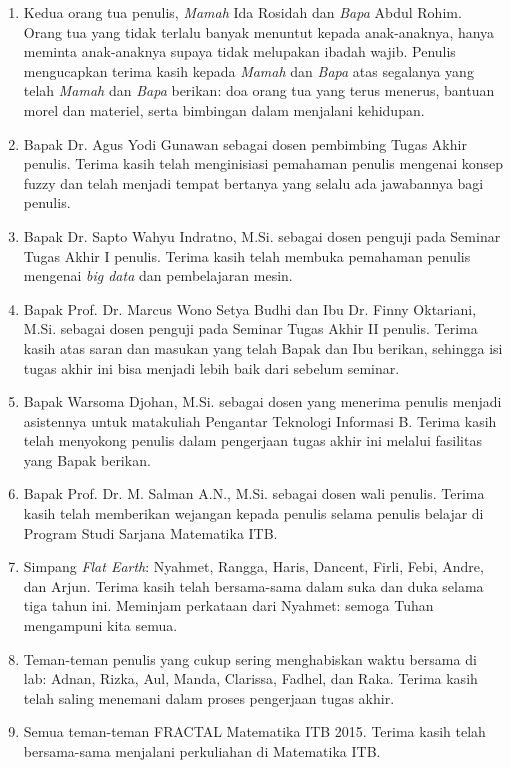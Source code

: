 \begin{terimakasih}
\begin{enumerate}
    \item Kedua orang tua penulis, \textit{Mamah} Ida Rosidah dan \textit{Bapa} Abdul Rohim. Orang tua yang tidak terlalu banyak menuntut kepada anak-anaknya, hanya meminta anak-anaknya supaya tidak melupakan ibadah wajib. Penulis mengucapkan terima kasih kepada \textit{Mamah} dan \textit{Bapa} atas segalanya yang telah \textit{Mamah} dan \textit{Bapa} berikan: doa orang tua yang terus menerus, bantuan morel dan materiel, serta bimbingan dalam menjalani kehidupan.
    \item Bapak Dr. Agus Yodi Gunawan sebagai dosen pembimbing Tugas Akhir penulis. Terima kasih telah menginisiasi pemahaman penulis mengenai konsep fuzzy dan telah menjadi tempat bertanya yang selalu ada jawabannya bagi penulis.
    \item Bapak Dr. Sapto Wahyu Indratno, M.Si. sebagai dosen penguji pada Seminar Tugas Akhir I penulis. Terima kasih telah membuka pemahaman penulis mengenai \textit{big data} dan pembelajaran mesin.
    \item Bapak Prof. Dr. Marcus Wono Setya Budhi dan Ibu Dr. Finny Oktariani, M.Si. sebagai dosen penguji pada Seminar Tugas Akhir II penulis. Terima kasih atas saran dan masukan yang telah Bapak dan Ibu berikan, sehingga isi tugas akhir ini bisa menjadi lebih baik dari sebelum seminar.
    \item Bapak Warsoma Djohan, M.Si. sebagai dosen yang menerima penulis menjadi asistennya untuk matakuliah Pengantar Teknologi Informasi B. Terima kasih telah menyokong penulis dalam pengerjaan tugas akhir ini melalui fasilitas yang Bapak berikan.
    \item Bapak Prof. Dr. M. Salman A.N., M.Si. sebagai dosen wali penulis. Terima kasih telah memberikan wejangan kepada penulis selama penulis belajar di Program Studi Sarjana Matematika ITB.
    \item Simpang \textit{Flat Earth}: Nyahmet, Rangga, Haris, Dancent, Firli, Febi, Andre, dan Arjun. Terima kasih telah bersama-sama dalam suka dan duka selama tiga tahun ini. Meminjam perkataan dari Nyahmet: semoga Tuhan mengampuni kita semua.
    \item Teman-teman penulis yang cukup sering menghabiskan waktu bersama di lab: Adnan, Rizka, Aul, Manda, Clarissa, Fadhel, dan Raka. Terima kasih telah saling menemani dalam proses pengerjaan tugas akhir.
    \item Semua teman-teman FRACTAL Matematika ITB 2015. Terima kasih telah bersama-sama menjalani perkuliahan di Matematika ITB.

\end{enumerate}
\end{terimakasih}
